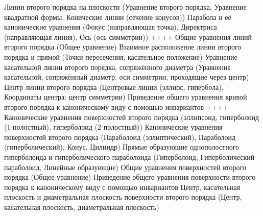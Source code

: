 Линии второго порядка на плоскости (Уравнение второго порядка, Уравнение квадратной формы, Конические линии (сечение конусов))
Парабола и её канонические уравнения (Фокус (направляющая точка), Директриса (направляющая линия), Ось (ось симметрии))
++++
Общие уравнения линий второго порядка (Общее уравнение)
Взаимное расположение линии второго порядка и прямой (Точки пересечения, касательное положение)
Уравнение касательной линии второго порядка, сопряжённого диаметра (Уравнение касательной, сопряжённый диаметр: оси симметрии, проходящие через центр)
Центр линии второго порядка (Центровые линии (эллипс, гипербола), Координаты центра: центр симметрии)
Приведение общего уравнения кривой второго порядка к каноническому виду с помощью инвариантов
++++
Канонические уравнения поверхностей второго порядка (эллипсоид, гиперболоид (1-полостный), гиперболоид (2-полостный))
Канонические уравнения поверхностей второго порядка (Параболоид (эллиптический), Параболоид (гиперболический), Конус, Цилиндр)
Прямые образующие однополостного гиперболоида и гиперболического параболоида (Гиперболоид, Гиперболический параболоид, Линейные образующие)
Общие уравнения поверхностей второго порядка (Общее уравнение)
Приведение общего уравнения поверхности второго порядка к каноническому виду с помощью инвариантов
Центр, касательная плоскость и диаметральная плоскость поверхности второго порядка (Центр, касательная плоскость, диаметральная плоскость)